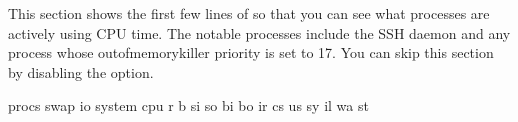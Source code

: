 \documentclass[letterpaper,10pt,english]{sphinxmanual}
\begin{document}
This section shows the first few lines of  so that you can see what
processes are actively using CPU time.  The notable processes include the SSH
daemon and any process whose out\sphinxhyphen{}of\sphinxhyphen{}memory\sphinxhyphen{}killer priority is set to 17. You
can skip this section by disabling the {\hyperref[\detokenize{mariadb-system-summary:cmdoption-mariadb-system-summary-summarize-processes}]{}} option.

\begin{sphinxVerbatim}[commandchars=\\\{\}]
  procs  \PYGZhy{}\PYGZhy{}\PYGZhy{}swap\PYGZhy{}\PYGZhy{} \PYGZhy{}\PYGZhy{}\PYGZhy{}\PYGZhy{}\PYGZhy{}io\PYGZhy{}\PYGZhy{}\PYGZhy{}\PYGZhy{} \PYGZhy{}\PYGZhy{}\PYGZhy{}system\PYGZhy{}\PYGZhy{}\PYGZhy{}\PYGZhy{} \PYGZhy{}\PYGZhy{}\PYGZhy{}\PYGZhy{}\PYGZhy{}\PYGZhy{}\PYGZhy{}\PYGZhy{}cpu\PYGZhy{}\PYGZhy{}\PYGZhy{}\PYGZhy{}\PYGZhy{}\PYGZhy{}\PYGZhy{}\PYGZhy{}
   r  b    si   so    bi    bo     ir     cs  us  sy  il  wa  st
                                              
                                            
                                            
                                            
                                          
\end{sphinxVerbatim}
\end{document}
